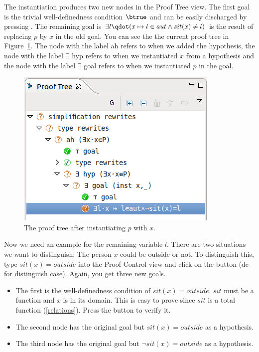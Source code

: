 The instantiation produces two new nodes in the \textsf{Proof Tree} view. The first goal is the trivial well-definedness condition $\btrue$ and
  can be easily discharged by pressing .
The remaining goal is $\exists l\qdot (x \mapsto  l \in  aut \land  sit(x) \neq l)$ is the result of replacing $p$ by $x$ in the old goal.
You can see the the current proof tree in Figure~\ref{fig_tut_10_proof_tree}. The node with the label \textsf{ah} refers to when we added the hypothesis, the node with the label \textsf{$\exists$ hyp} refers to when we instantiated $x$ from a hypothesis and the node with the label \textsf{$\exists$ goal} refers to when we instantiated $p$ in the goal.

\begin{figure}[!ht]
\begin{center}
	\includegraphics{img/tutorial/tut_10_proof_tree.png}
	\caption{The proof tree after instantiating $p$ with $x$.}
	\label{fig_tut_10_proof_tree}
\end{center}
\end{figure}

Now we need an example for the remaining variable $l$.
There are two situations we want to distinguish: The person $x$ could be outside or not.
To distinguish this, type $sit(x) = outside$ into the \textsf{Proof Control} view and click on the button  (\textsf{dc} for distinguish case).
Again, you get three new goals.

\begin{itemize}
\item The first is the well-definedness condition of $sit(x) = outside$. $sit$ must be a function and $x$ is in its domain.
  This is easy to prove since $sit$ is a total function (\ref{relations}). Press the  button to verify it. 
\item The second node has the original goal but $sit(x) = outside$ as a hypothesis.
\item The third node has the original goal but $\lnot sit(x) = outside$ as a hypothesis.
\end{itemize}

